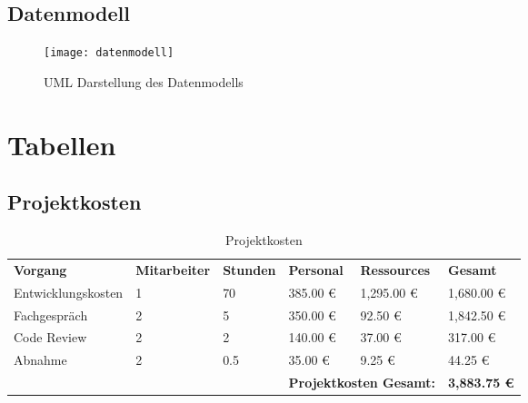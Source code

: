 \subsection{Datenmodell}
\begin{figure}[!htp]
    \caption{UML Darstellung des Datenmodells}
    \label{fig:datenmodell}
    \texttt{[image: datenmodell]}
    \centering
\end{figure}



\section{Tabellen}
\subsection{Projektkosten}
\begin{sidewaystable}[!htp]
	\centering
	\caption{Projektkosten}
	\label{tabelle:projektkosten}
	\begin{tabular}{llllll}
		\rowcolor[HTML]{9698ED}
		{\color[HTML]{FFFFFF} \textbf{Vorgang}} & {\color[HTML]{FFFFFF} \textbf{Mitarbeiter}} & {\color[HTML]{FFFFFF} \textbf{Stunden}} & {\color[HTML]{FFFFFF} \textbf{Personal}} & {\color[HTML]{FFFFFF} \textbf{Ressources}} & {\color[HTML]{FFFFFF} \textbf{Gesamt}} \\
		Entwicklungskosten                      & 1                                           & 70                                      & 385.00 €                                 & 1,295.00 €                                 & 1,680.00 €                             \\
		\rowcolor[HTML]{BBDAFF}
		Fachgespräch                            & 2                                           & 5                                       & 350.00 €                                 & 92.50 €                                    & 1,842.50 €                             \\
		Code Review                             & 2                                           & 2                                       & 140.00 €                                 & 37.00 €                                    & 317.00 €                               \\
		\rowcolor[HTML]{BBDAFF}
		Abnahme                                 & 2                                           & 0.5                                     & 35.00 €                                  & 9.25 €                                     & 44.25 €                                \\
		&                                             &                                         & \multicolumn{2}{l}{\textbf{Projektkosten Gesamt:}}                                    & \textbf{3,883.75 €}
	\end{tabular}
\end{sidewaystable}

